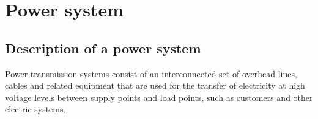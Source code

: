 \section{Power system}
\subsection{Description of a power system}
Power transmission systems consist of an interconnected set of overhead lines, cables and related equipment that are used for the transfer of electricity at high voltage levels
between supply points and load points, such as customers and other electric systems. \\

